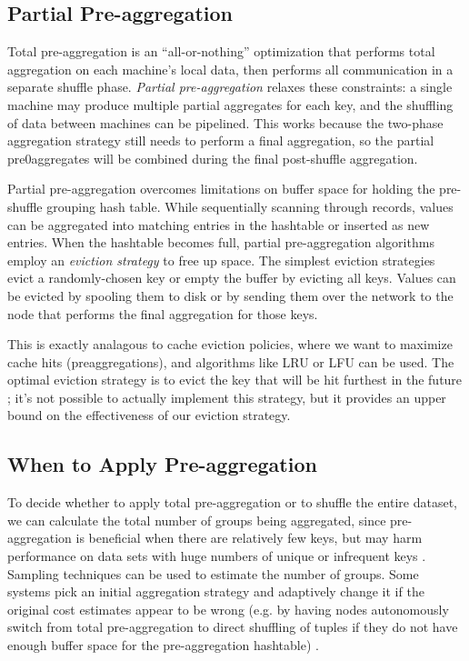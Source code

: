 \documentclass[12pt]{article}
\begin{document}
\subsection{Partial Pre-aggregation}

Total pre-aggregation is an ``all-or-nothing'' optimization that performs
total aggregation on each machine's local data, then performs all
communication in a separate shuffle phase.
\emph{Partial pre-aggregation} \cite{partial-preaggregation} relaxes these
constraints: a single machine may produce multiple partial aggregates for each
key, and the shuffling of data between machines can be pipelined.
This works because the two-phase aggregation strategy still needs to perform
a final aggregation, so the partial pre0aggregates will be combined during
the final post-shuffle aggregation.

Partial pre-aggregation overcomes limitations on buffer space for holding the pre-shuffle grouping hash table.
While sequentially scanning through records, values can be aggregated into matching entries in the hashtable or inserted as new entries.
When the hashtable becomes full, partial pre-aggregation algorithms employ an \emph{eviction strategy} to free up space.
The simplest eviction strategies evict a randomly-chosen key or empty the buffer by evicting all keys.
Values can be evicted by spooling them to disk or by sending them over the network to the node that performs the final aggregation for those keys.

This is exactly analagous to cache eviction policies, where we want to maximize cache hits (preaggregations), and algorithms like LRU or LFU can be used.
The optimal eviction strategy is to evict the key that will be hit furthest in
the future \cite{Belady1966}; it's not possible to actually implement this
strategy, but it provides an upper bound on the effectiveness of our eviction
strategy.

\subsection{When to Apply Pre-aggregation}

To decide whether to apply total pre-aggregation or to shuffle the entire
dataset, we can calculate the total number of groups being aggregated, since
pre-aggregation is beneficial when there are relatively few keys, but may harm
performance on data sets with huge numbers of unique or infrequent keys
\cite{adaptive-aggregation}.
Sampling techniques can be used to estimate the number of groups.
Some systems pick an initial aggregation strategy and adaptively change it if
the original cost estimates appear to be wrong (e.g. by having nodes
autonomously switch from total pre-aggregation to direct shuffling of tuples
if they do not have enough buffer space for the pre-aggregation hashtable)
\cite{adaptive-aggregation}.
\end{document}
